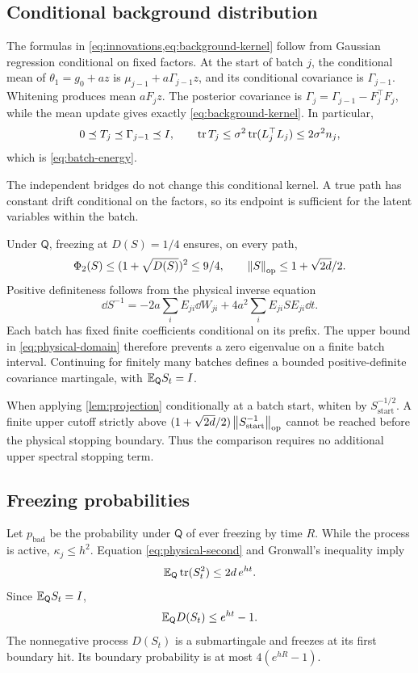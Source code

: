 \subsection{Conditional background distribution}

The formulas in \cref{eq:innovations,eq:background-kernel} follow from Gaussian regression conditional on fixed factors. At the start of batch $j$, the conditional mean of $\theta_1=g_0+az$ is $\mu_{j-1}+a\Gamma_{j-1}z$, and its conditional covariance is $\Gamma_{j-1}$. Whitening produces mean $aF_jz$. The posterior covariance is $\Gamma_j=\Gamma_{j-1}-F_j^\top F_j$, while the mean update gives exactly \cref{eq:background-kernel}. In particular,
\[
 0\preceq T_j\preceq\Gamma_{j-1}\preceq I,\qquad
 \operatorname{tr} T_j\le\sigma^2\operatorname{tr}(L_j^\top L_j)\le2\sigma^2n_j,
\]
which is \cref{eq:batch-energy}.

The independent bridges do not change this conditional kernel. A true path has constant drift conditional on the factors, so its endpoint is sufficient for the latent variables within the batch.

Under $\mathsf Q$, freezing at $D(S)=1/4$ ensures, on every path,
\begin{equation}
 \Phi_2(S)\le(1+\sqrt{D(S)})^2\le9/4,
 \qquad \left\lVert S\right\rVert_{\mathrm{op}}\le1+\sqrt{2d}/2.
 \label{eq:physical-domain}
\end{equation}
Positive definiteness follows from the physical inverse equation
\[
 \dd S^{-1}
 =-2a\sum_iE_{ji}\dd W_{ji}
       +4a^2\sum_iE_{ji}SE_{ji}\dd t.
\]
Each batch has fixed finite coefficients conditional on its prefix. The upper bound in \cref{eq:physical-domain} therefore prevents a zero eigenvalue on a finite batch interval. Continuing for finitely many batches defines a bounded positive-definite covariance martingale, with
$\mathbb E_{\mathsf Q}S_t=I$.

When applying \cref{lem:projection} conditionally at a batch start, whiten by $S_{\mathrm{start}}^{-1/2}$. A finite upper cutoff strictly above
$(1+\sqrt{2d}/2)\left\lVert S_{\mathrm{start}}^{-1}\right\rVert_{\mathrm{op}}$ cannot be reached before the physical stopping boundary. Thus the comparison requires no additional upper spectral stopping term.

\subsection{Freezing probabilities}

Let $p_{\mathrm{bad}}$ be the probability under $\mathsf Q$ of ever freezing by time $R$. While the process is active, $\kappa_j\le h^2$. Equation \eqref{eq:physical-second} and Gronwall's inequality imply
\[
 \mathbb E_{\mathsf Q}\operatorname{tr}(S_t^2)\le2d\,e^{ht}.
\]
Since $\mathbb E_{\mathsf Q}S_t=I$,
\begin{equation}
 \mathbb E_{\mathsf Q}D(S_t)\le e^{ht}-1.
 \label{eq:D-bound}
\end{equation}
The nonnegative process $D(S_t)$ is a submartingale and freezes at its first boundary hit. Its boundary probability is at most $4(e^{hR}-1)$.

